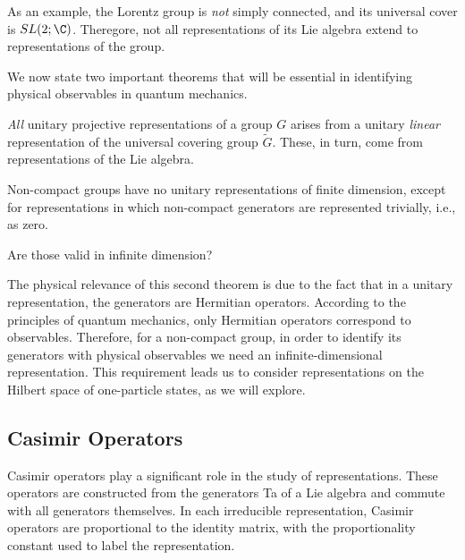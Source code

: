 As an example, the Lorentz group is \emph{not} simply connected, and its universal cover is $SL(2;\C)$. Theregore, not all representations of its Lie algebra extend to representations of the group.

We now state two important theorems that will be essential in identifying physical observables in quantum mechanics.
\begin{theorem}\label{th:unitary-rep}
    \emph{All} unitary projective representations of a group $G$ arises from a unitary \emph{linear} representation of the universal covering group $\tilde{G}$. These, in turn, come from representations of the Lie algebra.
\end{theorem}


\begin{theorem}\label{th:non-compact-group-rep}
    Non-compact groups have no unitary representations of finite dimension, except for representations in which non-compact generators are represented trivially, i.e., as zero.
\end{theorem}

\color{red} Are those valid in infinite dimension?\color{black}

The physical relevance of this second theorem is due to the fact that in a unitary representation, the generators are Hermitian operators. According to the principles of quantum mechanics, only Hermitian operators correspond to observables. Therefore, for a non-compact group, in order to identify its generators with physical observables we need an infinite-dimensional representation. This requirement leads us to consider representations on the Hilbert space of one-particle states, as we will explore.



\subsection{Casimir Operators}\label{sec:casimir}
Casimir operators play a significant role in the study of representations. These operators are constructed from the generators Ta of a Lie algebra and commute with all generators themselves. In each irreducible representation, Casimir operators are proportional to the identity matrix, with the proportionality constant used to label the representation.
